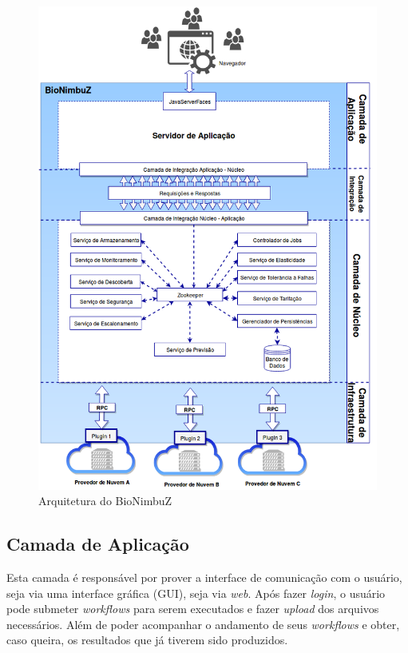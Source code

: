\begin{figure}[htbp]
	\centerline{\includegraphics[scale=0.45]{img/ArquiteturaBioNimbuZ.png}}
	\caption{Arquitetura do BioNimbuZ\cite{Alves_BioNimbuz}}
	\label{Arquitetura}
\end{figure}



\subsection{Camada de Aplicação} Esta camada é responsável por prover a interface de comunicação com o usuário, seja via uma interface gráfica (GUI), seja via \textit{web}. Após fazer \textit{login}, o usuário pode submeter \textit{workflows} para serem executados e fazer \textit{upload} dos arquivos necessários. Além de poder acompanhar o andamento de seus \textit{workflows} e obter, caso queira, os resultados que já tiverem sido produzidos.

